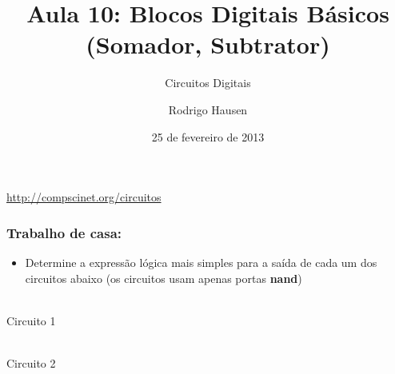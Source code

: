 \documentclass{beamer}
\title{Aula 10: Blocos Digitais Básicos (Somador, Subtrator)}
\subtitle{Circuitos Digitais}
\author{Rodrigo Hausen}
\institute{CMCC -- UFABC}
\date{25 de fevereiro de 2013}
\begin{document}
\begin{frame}
\maketitle

\vspace{-1cm}

\begin{center}
\url{http://compscinet.org/circuitos}
\end{center}

\end{frame}


\begin{frame}
\frametitle{Trabalho de casa:}

\begin{itemize}
\item Determine a expressão lógica mais simples para a saída de cada um dos
circuitos abaixo (os circuitos usam apenas portas \textbf{nand})
\end{itemize}
\begin{center}
\begin{minipage}{0.2\textwidth}
%
\\
Circuito 1
\end{minipage}
\hspace{8ex}
\begin{minipage}{0.4\textwidth}
%
\\
Circuito 2
\end{minipage}


\end{center}
\end{frame}
\end{document}
